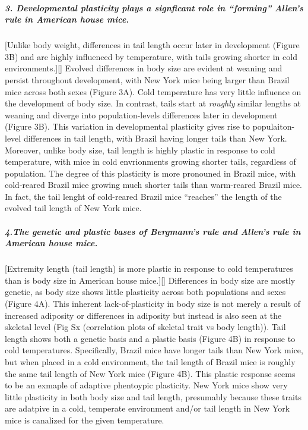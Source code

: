 \documentclass[]{article}
\let\oldsubparagraph\subparagraph
\renewcommand{\subparagraph}[1]{\oldsubparagraph{#1}\mbox{}}
\begin{document}
\hypertarget{developmental-plasticity-plays-a-signficant-role-in-forming-allens-rule-in-american-house-mice.}{%
\subparagraph{\texorpdfstring{\textbf{3. Developmental plasticity plays
a signficant role in ``forming'' Allen's rule in American house
mice.}}{3. Developmental plasticity plays a signficant role in ``forming'' Allen's rule in American house mice.}}\label{developmental-plasticity-plays-a-signficant-role-in-forming-allens-rule-in-american-house-mice.}}

{[}Unlike body weight, differences in tail length occur later in
development (Figure 3B) and are highly influenced by temperature, with
tails growing shorter in cold environments.{]}{[}{]} Evolved differences
in body size are evident at weaning and persist throughout development,
with New York mice being larger than Brazil mice across both sexes
(Figure 3A). Cold temperature has very little influence on the
development of body size. In contrast, tails start at \emph{roughly}
similar lengths at weaning and diverge into population-levels
differences later in development (Figure 3B). This variation in
developmental plasticity gives rise to populaiton-level differences in
tail length, with Brazil having longer tails than New York. Moreover,
unlike body size, tail length is highly plastic in response to cold
temperature, with mice in cold envrionments growing shorter tails,
regardless of population. The degree of this plasticity is more
pronouned in Brazil mice, with cold-reared Brazil mice growing much
shorter tails than warm-reared Brazil mice. In fact, the tail lenght of
cold-reared Brazil mice ``reaches'' the length of the evolved tail
length of New York mice.

\hypertarget{the-genetic-and-plastic-bases-of-bergmanns-rule-and-allens-rule-in-american-house-mice.}{%
\subparagraph{\texorpdfstring{\textbf{4.The genetic and plastic bases of
Bergmann's rule and Allen's rule in American house
mice.}}{4.The genetic and plastic bases of Bergmann's rule and Allen's rule in American house mice.}}\label{the-genetic-and-plastic-bases-of-bergmanns-rule-and-allens-rule-in-american-house-mice.}}

{[}Extremity length (tail length) is more plastic in response to cold
temperatures than is body size in American house mice.{]}{[}{]}
Differences in body size are mostly genetic, as body size shows little
plasticity across both populations and sexes (Figure 4A). This inherent
lack-of-plasticity in body size is not merely a result of increased
adiposity or differences in adiposity but instead is also seen at the
skeletal level (Fig Sx (correlation plots of skeletal trait vs body
length)). Tail length shows both a genetic basis and a plastic basis
(Figure 4B) in response to cold temperatures. Specifically, Brazil mice
have longer tails than New York mice, but when placed in a cold
environment, the tail length of Brazil mice is roughly the same tail
length of New York mice (Figure 4B). This plastic response seems to be
an exmaple of adaptive phentoypic plasticity. New York mice show very
little plasticity in both body size and tail length, presumably because
these traits are adatpive in a cold, temperate environment and/or tail
length in New York mice is canalized for the given temperature.
\end{document}
